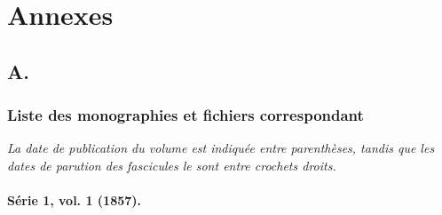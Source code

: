 \part*{Annexes}
\appendix
\renewcommand{\thechapter}{A}
\chapter{A. \lodm}

\section{Liste des monographies et fichiers correspondant}
\label{mapping}

\textit{La date de publication du volume est indiquée entre parenthèses, tandis que les dates de parution des fascicules le sont entre crochets droits.}

\subsection{Série 1, vol. 1 (1857).}

